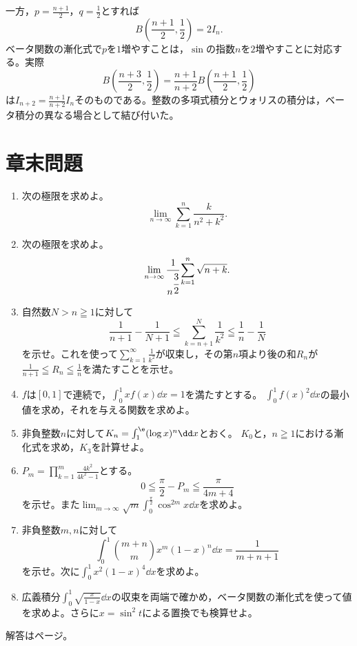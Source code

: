 一方，$p=\frac{n+1}{2}$，$q=\frac12$とすれば
\[
 B\left(\frac{n+1}{2},\frac12\right)=2I_n.
\]
ベータ関数の漸化式で$p$を$1$増やすことは，$\sin$の指数$n$を$2$増やすことに対応する。実際
\[
 B\left(\frac{n+3}{2},\frac12\right)
 =\frac{n+1}{n+2}
  B\left(\frac{n+1}{2},\frac12\right)
\]
は$I_{n+2}=\frac{n+1}{n+2}I_n$そのものである。整数の多項式積分とウォリスの積分は，ベータ積分の異なる場合として結び付いた。

\section*{章末問題}
\begin{enumerate}[label=\textbf{\thechapter.\arabic*},leftmargin=*]
 \item\label{問:区分求積分子が添字}
 次の極限を求めよ。
 \[
  \lim_{n\to\infty}\sum_{k=1}^{n}\frac{k}{n^2+k^2}.
 \]
 \item\label{問:区分求積根号}
 次の極限を求めよ。
 \[
  \lim_{n\to\infty}\cfrac1{n^{\cfrac32}}
      \sum_{k=1}^{n}\sqrt{n+k}.
 \]
 \item\label{問:逆平方和の残り}
 自然数$N>n\geqq1$に対して
 \[
  \frac1{n+1}-\frac1{N+1}
  \leqq\sum_{k=n+1}^{N}\frac1{k^2}
  \leqq\frac1n-\frac1N
 \]
 を示せ。これを使って$\sum_{k=1}^{\infty}\frac1{k^2}$が収束し，その第$n$項より後の和$R_n$が
 $\frac1{n+1}\leqq R_n\leqq\frac1n$を満たすことを示せ。
 \item\label{問:積分制約と二乗}
 $f$は$[0,1]$で連続で，$\int_0^1xf(x)\dd x=1$を満たすとする。
 $\int_0^1f(x)^2\dd x$の最小値を求め，それを与える関数を求めよ。
 \item\label{問:対数の積分漸化式}
 非負整数$n$に対して$K_n=\int_1^{\e}(\log x)^n\dd x$とおく。
 $K_0$と，$n\geqq1$における漸化式を求め，$K_3$を計算せよ。
 \item\label{問:ウォリス積の誤差}
 $P_m=\prod_{k=1}^{m}\frac{4k^2}{4k^2-1}$とする。
 \[
 0\leqq\frac{\pi}{2}-P_m\leqq\frac{\pi}{4m+4}
 \]
 を示せ。また$\lim_{m\to\infty}\sqrt m\int_0^{\frac{\pi}{2}}\cos^{2m}x\dd x$を求めよ。
 \item\label{問:整数ベータ二項係数}
 非負整数$m,n$に対して
 \[
 \int_0^1\binom{m+n}{m}x^m(1-x)^n\dd x=\frac1{m+n+1}
 \]
 を示せ。次に$\int_0^1x^2(1-x)^4\dd x$を求めよ。
 \item\label{問:半整数ベータ}
 広義積分$\int_0^1\sqrt{\frac{x}{1-x}}\dd x$の収束を両端で確かめ，ベータ関数の漸化式を使って値を求めよ。さらに$x=\sin^2t$による置換でも検算せよ。
\end{enumerate}

\smallskip\noindent 解答は\pageref{解答:第9章}ページ。
